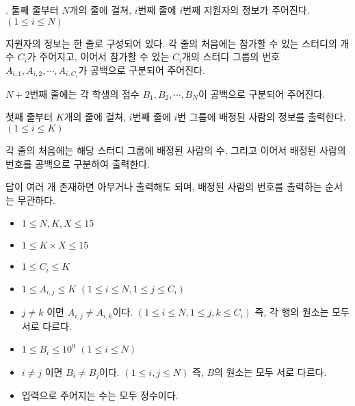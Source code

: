 \begin{problem}{\probno{}. \probtitle{}}
둘째 줄부터 $N$개의 줄에 걸쳐, $i$번째 줄에 $i$번째 지원자의 정보가 주어진다. $(1 \le i \le N)$

지원자의 정보는 한 줄로 구성되어 있다. 각 줄의 처음에는 참가할 수 있는 스터디의 개수 $C_i$가 주어지고, 이어서 참가할 수 있는 $C_i$개의 스터디 그룹의 번호 $A_{i, 1}, A_{i, 2}, \cdots, A_{i, C_i}$가 공백으로 구분되어 주어진다.

$N+2$번째 줄에는 각 학생의 점수 $B_1, B_2, \cdots, B_N$이 공백으로 구분되어 주어진다.

\OutputFile

첫째 줄부터 $K$개의 줄에 걸쳐, $i$번째 줄에 $i$번 그룹에 배정된 사람의 정보를 출력한다. $(1 \le i \le K)$

각 줄의 처음에는 해당 스터디 그룹에 배정된 사람의 수, 그리고 이어서 배정된 사람의 번호를 공백으로 구분하여 출력한다.

답이 여러 개 존재하면 아무거나 출력해도 되며, 배정된 사람의 번호를 출력하는 순서는 무관하다.

\Constraints

\begin{itemize}[noitemsep]
    \item $1 \leq N, K, X \leq 15$
    \item $1 \leq K \times X \leq 15$
    \item $1 \leq C_i \leq K$
    \item $1 \leq A_{i, j} \leq K$ $(1 \le i \le N, 1 \le j \le C_i)$
    \item $j \ne k$ 이면 $A_{i, j} \ne A_{i, k}$이다. $(1 \le i \le N, 1 \le j, k \le C_i)$ 즉, 각 행의 원소는 모두 서로 다르다.
    \item $1 \leq B_i \leq 10^9$ $(1 \le i \le N)$
    \item $i \ne j$ 이면 $B_i \ne B_j$이다. $(1 \le i,j \le N)$ 즉, $B$의 원소는 모두 서로 다르다.
    \item 입력으로 주어지는 수는 모두 정수이다.
\end{itemize}

\Example

\begin{example}
\end{example}




\end{problem}